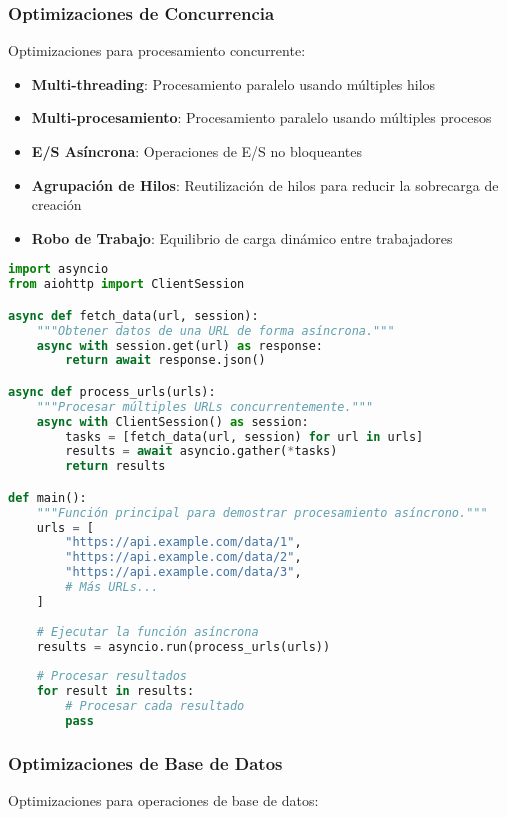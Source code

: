\subsubsection{Optimizaciones de Concurrencia}
Optimizaciones para procesamiento concurrente:

\begin{itemize}
    \item \textbf{Multi-threading}: Procesamiento paralelo usando múltiples hilos
    \item \textbf{Multi-procesamiento}: Procesamiento paralelo usando múltiples procesos
    \item \textbf{E/S Asíncrona}: Operaciones de E/S no bloqueantes
    \item \textbf{Agrupación de Hilos}: Reutilización de hilos para reducir la sobrecarga de creación
    \item \textbf{Robo de Trabajo}: Equilibrio de carga dinámico entre trabajadores
\end{itemize}

\begin{lstlisting}[language=python, caption=Procesamiento Asíncrono]
import asyncio
from aiohttp import ClientSession

async def fetch_data(url, session):
    """Obtener datos de una URL de forma asíncrona."""
    async with session.get(url) as response:
        return await response.json()

async def process_urls(urls):
    """Procesar múltiples URLs concurrentemente."""
    async with ClientSession() as session:
        tasks = [fetch_data(url, session) for url in urls]
        results = await asyncio.gather(*tasks)
        return results

def main():
    """Función principal para demostrar procesamiento asíncrono."""
    urls = [
        "https://api.example.com/data/1",
        "https://api.example.com/data/2",
        "https://api.example.com/data/3",
        # Más URLs...
    ]
    
    # Ejecutar la función asíncrona
    results = asyncio.run(process_urls(urls))
    
    # Procesar resultados
    for result in results:
        # Procesar cada resultado
        pass
\end{lstlisting}

\subsubsection{Optimizaciones de Base de Datos}
Optimizaciones para operaciones de base de datos:

